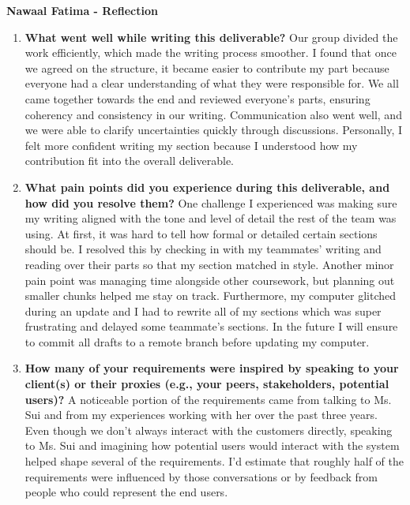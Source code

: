 \documentclass[12pt]{article}
\begin{document}




\textbf{Nawaal Fatima - Reflection}
\begin{enumerate}
  \item \textbf{What went well while writing this deliverable?} \newline
    Our group divided the work efficiently, which made the writing
    process smoother. I found that once we agreed on the structure,
    it became easier to contribute my part because everyone had a
    clear understanding of what they were responsible for.
    We all came together towards the end and reviewed everyone's
    parts, ensuring coherency and consistency in our writing.
    Communication also went well, and we were able to clarify
    uncertainties quickly through discussions. Personally, I felt
    more confident writing my section because I understood how my
    contribution fit into the overall deliverable.

  \item \textbf{What pain points did you experience during this
    deliverable, and how did you resolve them?} \newline
    One challenge I experienced was making sure my writing aligned
    with the tone and level of detail the rest of the team was using.
    At first, it was hard to tell how formal or detailed certain
    sections should be. I resolved this by checking in with my teammates'
    writing and reading over their parts so that my section matched in style.
    Another minor pain point was managing time alongside other
    coursework, but planning out smaller chunks helped me stay on track.
    Furthermore, my computer glitched during an update and I had to
    rewrite all of my sections which was super frustrating and
    delayed some teammate's sections. In the future I will ensure to
    commit all drafts to a remote branch before updating my computer.

  \item \textbf{How many of your requirements were inspired by
      speaking to your client(s) or their proxies (e.g., your peers,
    stakeholders, potential users)?} \newline
    A noticeable portion of the requirements came from talking to
    Ms. Sui and from my experiences working with her over the past
    three years. Even though we don't always interact with the customers
    directly, speaking to Ms. Sui and imagining how potential users
    would interact with the system helped shape several of the
    requirements. I'd estimate that roughly half of the requirements
    were influenced by those conversations or by feedback from people
    who could represent the end users.


\end{enumerate}
\end{document}
